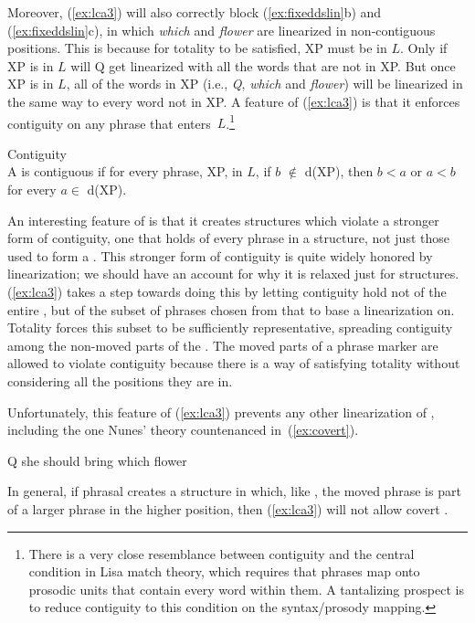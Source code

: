 \documentclass[output=paper]{langsci/langscibook}
\begin{document}
Moreover, (\ref{ex:lca3}) will also correctly block (\ref{ex:fixeddslin}b) and
(\ref{ex:fixeddslin}c), in which \emph{which} and \emph{flower} are linearized
in non-contiguous positions. This is because for totality to be satisfied, XP
must be in $L$. Only if XP is in $L$ will Q get linearized with all the words
that are not in XP. But once XP is in $L$, all of the words in XP (i.e.,
\emph{Q}, \emph{which} and \emph{flower}) will be linearized in the same way to
every word not in XP. A feature of (\ref{ex:lca3}) is that it enforces
contiguity on any phrase that enters~$L$.\footnote{There is a very close
resemblance between contiguity and the central condition in Lisa 
match theory, which requires that phrases map onto
prosodic units that contain every word within them. A tantalizing prospect is
to reduce contiguity to this condition on the syntax/prosody mapping.} %
\begin{exe}
	\ex \label{ex:contiguity} Contiguity\\
	A  is contiguous if for every phrase, XP, in $L$, if $b$ $\notin$ d(XP), then $b<a$ or $a<b$ for every $a \in$ d(XP).
\end{exe}

An interesting feature of  is that it creates structures which violate
a stronger form of contiguity, one that holds of every phrase in a structure,
not just those used to form a . This stronger form of contiguity
is quite widely honored by linearization; we should have an account for why it
is relaxed just for  structures. (\ref{ex:lca3}) takes a step towards
doing this by letting contiguity hold not of the entire , but of
the subset of phrases chosen from that  to base a linearization
on. Totality forces this subset to be sufficiently representative, spreading
contiguity among the non-moved parts of the . The moved parts of a
phrase marker are allowed to violate contiguity because there is a way of
satisfying totality without considering all the positions they are in.

Unfortunately, this feature of (\ref{ex:lca3}) prevents any other linearization
of , including the one Nunes' theory countenanced
in~(\ref{ex:covert}).

\begin{exe}
	\ex \label{ex:covert} Q she should bring which flower
\end{exe}

In general, if phrasal  creates a structure in which, like
, the moved phrase is part of a larger phrase in the higher
position, then (\ref{ex:lca3}) will not allow covert .
\end{document}
